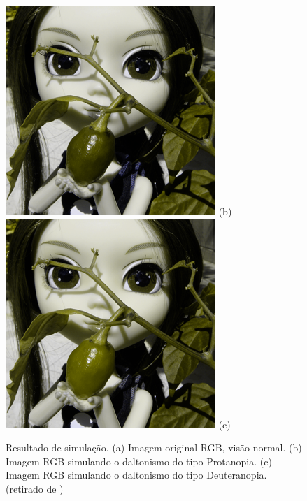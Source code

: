 \documentclass[	12pt, Times, openright, twoside, a4paper, english, brazil]{abntex2}
\begin{document}
\begin{figure}[!htb]
{\includegraphics[width=\linewidth]{figuraSimuladorProtan.png}}
(b)
\endminipage\hfill
{}%
\centering
{\includegraphics[width=\linewidth]{figuraSimuladorDeutan.png}}
(c)
\endminipage
\caption{Resultado de simulação. (a) Imagem original RGB, visão normal. (b) Imagem RGB simulando o daltonismo do tipo Protanopia. (c) Imagem RGB simulando o daltonismo do tipo Deuteranopia. (retirado de  )}
\label{fig:figuraSimulador}
\end{figure}
\end{document}
